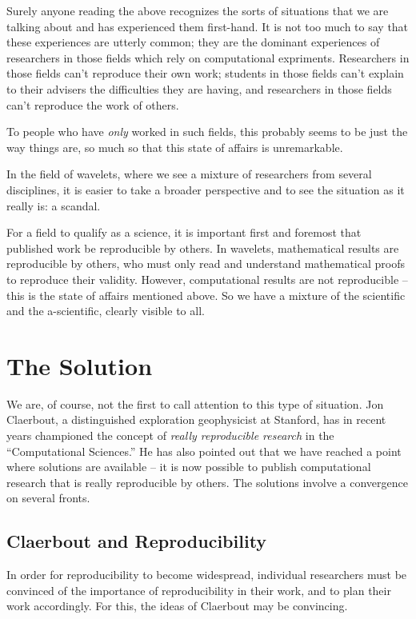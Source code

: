 Surely anyone reading the above recognizes the sorts
of situations that we are talking
about and has experienced them first-hand.  
It is not too much to say that these experiences are utterly common;
they are the dominant experiences of researchers in those fields
which rely on computational expriments. 
Researchers in those fields can't reproduce their own work; 
students in those fields can't explain to their advisers the difficulties they
are having, 
and researchers in those fields can't reproduce the work of others.

To people who have {\it only} worked in such fields, this probably
seems to be just the way
things are, so much so that this state of affairs is unremarkable.

In the field of wavelets, where we see a mixture of
researchers from several disciplines, it is easier to take a broader
perspective and to see the situation as it really is:
a scandal.  

For a field to qualify as a science, it is important first and foremost
that published work be reproducible by others.  In wavelets, mathematical
results are reproducible by others, who must only read and understand
mathematical proofs to reproduce their validity.  However, computational
results are not reproducible -- this is the state of affairs
mentioned above.  So we have a mixture of the scientific and 
the a-scientific, clearly visible to all. 

\section{The Solution}
 
We are, of course, not the first to call attention to
this type of situation.
Jon Claerbout, a distinguished exploration geophysicist at Stanford, has in recent
years championed the concept of {\it really reproducible research} in the
``Computational Sciences.''   He has also pointed out that we have reached
a point where solutions are available -- it is now
possible to publish computational
research that is really reproducible by others.  
The solutions involve a convergence
on several fronts.

\subsection{Claerbout and Reproducibility}

In order for reproducibility to become widespread, individual
researchers must be convinced of the
importance of reproducibility in their work,
and to plan their work accordingly.  For this, the ideas
of Claerbout may be convincing.

